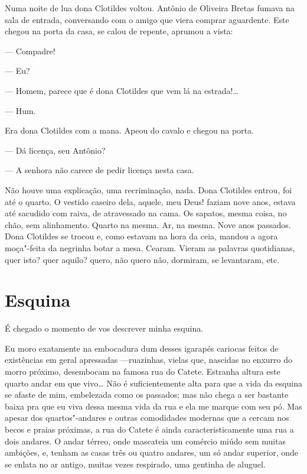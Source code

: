 Numa noite de lua dona Clotildes voltou. Antônio de Oliveira Bretas
fumava na sala de entrada, conversando com o amigo que viera comprar
aguardente. Este chegou na porta da casa, se calou de repente, aprumou a
vista:

--- Compadre!

--- Eu?

--- Homem, parece que é dona Clotildes que vem lá na estrada!\ldots{}

--- Hum.

Era dona Clotildes com a mana. Apeou do cavalo e chegou na porta.

--- Dá licença, seu Antônio?

--- A senhora não carece de pedir licença nesta casa.

Não houve uma explicação, uma recriminação, nada. Dona Clotildes entrou,
foi até o quarto. O vestido caseiro dela, aquele, meu Deus! faziam nove
anos, estava até sacudido com raiva, de atravessado na cama. Os sapatos,
mesma coisa, no chão, sem alinhamento. Quarto na mesma. Ar, na mesma.
Nove anos passados. Dona Clotildes se trocou e, como estavam na hora da
ceia, mandou a agora moça"-feita da negrinha botar a mesa. Cearam. Vieram
as palavras quotidianas, quer isto? quer aquilo? quero, não quero não,
dormiram, se levantaram, etc.

\chapter{Esquina}

É chegado o momento de vos descrever minha esquina.

Eu moro exatamente na embocadura dum desses igarapés cariocas feitos de
existências em geral apressadas ---ruazinhas, vielas que, nascidas no
enxurro do morro próximo, desembocam na famosa rua do Catete. Estranha
altura este quarto andar em que vivo\ldots{} Não é suficientemente alta para
que a vida da esquina se afaste de mim, embelezada como os passados; mas
não chega a ser bastante baixa pra que eu viva dessa mesma vida da rua e
ela me marque com seu pó. Mas apesar dos quartos"-andares e outras
comodidades modernas que a cercam nos becos e praias próximas, a rua do
Catete é ainda caracteristicamente uma rua a dois andares. O andar
térreo, onde mascateia um comércio miúdo sem muitas ambições, e, tenham
as casas três ou quatro andares, um só andar superior, onde se enlata no
ar antigo, muitas vezes respirado, uma gentinha de aluguel.

